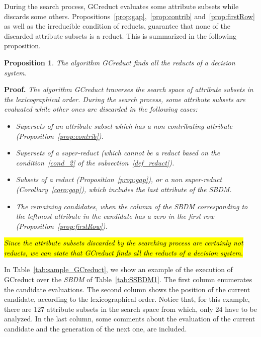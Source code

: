 \documentclass[number,preprint,review,12pt]{elsarticle}
\newtheorem{proposition}{Proposition}
\begin{document}
    During the search process, GCreduct evaluates some attribute subsets while discards some others. Propositions~\ref{prop:gap},~\ref{prop:contrib} and~\ref{prop:firstRow} as well as the irreducible condition of reducts, guarantee that none of the discarded attribute subsets is a reduct. This is summarized in the following proposition.
	
	\begin{proposition}\label{prop:findall}
		The algorithm GCreduct finds all the reducts of a decision system.
	\end{proposition}
	
	\noindent
	\textbf{Proof.} \textit{The algorithm GCreduct traverses the search space of attribute subsets in the lexicographical order. During the search process, some attribute subsets are evaluated while other ones are discarded in the following cases:}
		\begin{itemize}
			\item \textit{Supersets of an attribute subset which has a non contributing attribute (Proposition~\ref{prop:contrib}).}
			\item \textit{Supersets of a super-reduct (which cannot be a reduct based on the condition~\ref{cond_2} of the subsection~\ref{def_reduct}).}
			\item \textit{Subsets of a reduct (Proposition~\ref{prop:gap}), or a non super-reduct (Corollary~\ref{coro:gap}), which includes the last attribute of the \textit{SBDM}.}
			\item \textit{The remaining candidates, when the column of the \textit{SBDM} corresponding to the leftmost attribute in the candidate has a zero in the first row (Proposition~\ref{prop:firstRow}).}
		\end{itemize} 
	\textit{\hl{Since the attribute subsets discarded by the searching process are certainly not reducts, we can state that GCreduct finds all the reducts of a decision system.}}
	
	In Table~\ref{tab:sample_GCreduct}, we show an example of the execution of GCreduct over the \textit{SBDM} of Table~\ref{tab:SSBDM1}. The first column enumerates the candidate evaluations. The second column shows the position of the current candidate, according to the lexicographical order. Notice that, for this example, there are 127 attribute subsets in the search space from which, only 24 have to be analyzed. In the last column, some comments about the evaluation of the current candidate and the generation of the next one, are included.
	
\end{document}
